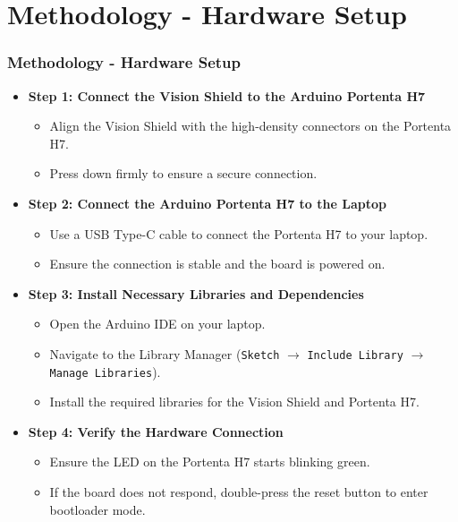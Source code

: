 \documentclass[10pt, a4paper]{beamer}
\begin{document}
	
	\section{Methodology - Hardware Setup}
	\begin{frame}
		\frametitle{Methodology - Hardware Setup}
		
		\begin{itemize}
			\item \textbf{Step 1: Connect the Vision Shield to the Arduino Portenta H7}
			\begin{itemize}
				\item Align the Vision Shield with the high-density connectors on the Portenta H7.
				\item Press down firmly to ensure a secure connection.
			\end{itemize}
			
			\item \textbf{Step 2: Connect the Arduino Portenta H7 to the Laptop}
			\begin{itemize}
				\item Use a USB Type-C cable to connect the Portenta H7 to your laptop.
				\item Ensure the connection is stable and the board is powered on.
			\end{itemize}
			
			\item \textbf{Step 3: Install Necessary Libraries and Dependencies}
			\begin{itemize}
				\item Open the Arduino IDE on your laptop.
				\item Navigate to the Library Manager (\texttt{Sketch} $\rightarrow$ \texttt{Include Library} $\rightarrow$ \texttt{Manage Libraries}).
				\item Install the required libraries for the Vision Shield and Portenta H7.
			\end{itemize}
			
			\item \textbf{Step 4: Verify the Hardware Connection}
			\begin{itemize}
				\item Ensure the LED on the Portenta H7 starts blinking green.
				\item If the board does not respond, double-press the reset button to enter bootloader mode.
			\end{itemize}
		\end{itemize}
		
	\end{frame}
	
\end{document}
